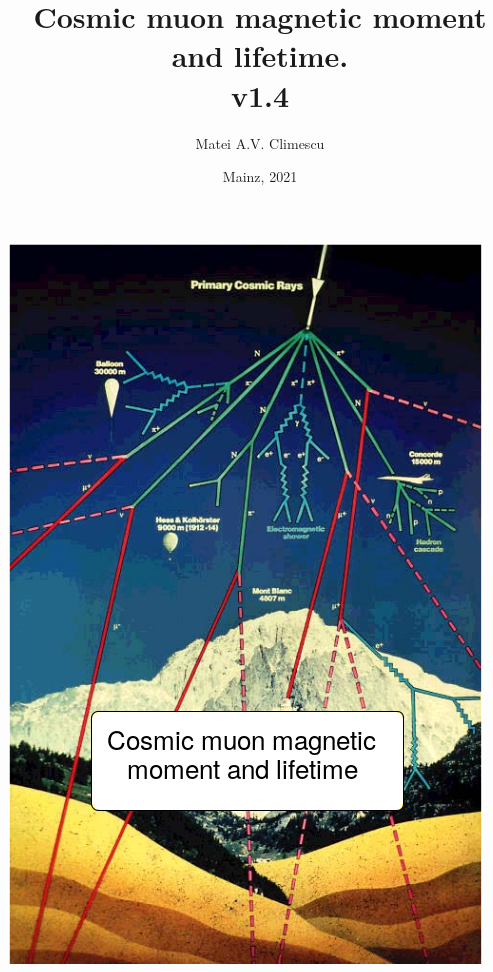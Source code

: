 \documentclass[12pt]{report}
\title{Cosmic muon magnetic moment and lifetime.\\
	\large v1.4}
\author{Matei A.V. Climescu}
\date{Mainz, 2021}
\newenvironment{changemargin}[2]{%
\begin{list}{}{%
\setlength{\topsep}{0pt}%
\setlength{\leftmargin}{#1}%
\setlength{\rightmargin}{#2}%
\setlength{\listparindent}{\parindent}%
\setlength{\itemindent}{\parindent}%
\setlength{\parsep}{\parskip}%
}%
\item[]}{\end{list}}
\begin{document}
\maketitle
\begin{titlepage}
\begin{changemargin}{-0cm}{-0cm}
\includegraphics[width=\linewidth]{./fig/cover.png}
\end{changemargin}
\end{titlepage}


    
    
    
    
    
    
    
    




\end{document}
